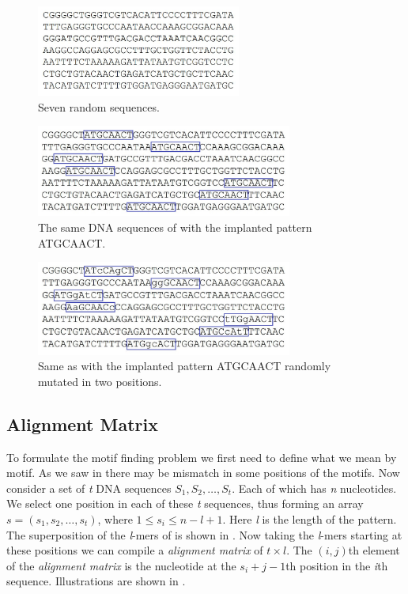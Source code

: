 \begin{figure}[H]
	\centering
	\includegraphics[width=0.6\textwidth]{figures/seq1}
	\caption{Seven random sequences.}
	\label{fig:seq1}
\end{figure}
\begin{figure}[!tb]
	\centering
	\includegraphics[width=0.75\textwidth]{figures/seq2}
	\caption{The same DNA sequences of 
		with the implanted pattern ATGCAACT.}
	\label{fig:seq2}
\end{figure}
\begin{figure}[!tb]
	\centering
	\includegraphics[width=0.75\textwidth]{figures/seq3}
	\caption{Same as  with the implanted
		pattern ATGCAACT randomly
		mutated in two positions.}
	\label{fig:seq3}
\end{figure}


\subsection{Alignment Matrix}
To formulate the motif finding problem we first need to define
what we mean by motif. As we saw in  there may be
mismatch in some positions of the motifs. Now consider a set of \textit{t} DNA sequences $ S_{1}, S_{2},\ldots, S_{t} $. Each of which has \textit{n} nucleotides. We select one position in each of these \textit{t} sequences, thus forming an array
$ s = (s_{1}, s_{2},\ldots,s_{t}) $, where $ 1 \leq s_{i} \leq n - l + 1$.
Here \textit{l} is the length of the pattern. The superposition
of the \textit{l}-mers of  is shown in .
Now taking the \textit{l}-mers starting at these positions
we can compile a \textit{alignment matrix}
of $ t \times l $. The $ (i, j) $th element of the \textit{alignment matrix}
is the nucleotide at the $ s_{i}+j-1 $th position in the
\textit{i}th sequence. Illustrations are shown in .


